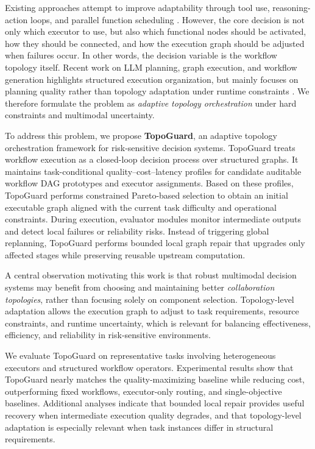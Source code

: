 \documentclass[manuscript,review,anonymous]{acmart}
\begin{document}
Existing approaches attempt to improve adaptability through tool use, reasoning-action loops, and parallel function scheduling \cite{schick2023toolformer,yao2023react,kim2024llm}. However, the core decision is not only which executor to use, but also which functional nodes should be activated, how they should be connected, and how the execution graph should be adjusted when failures occur. In other words, the decision variable is the workflow topology itself. Recent work on LLM planning, graph execution, and workflow generation highlights structured execution organization, but mainly focuses on planning quality rather than topology adaptation under runtime constraints \cite{huang2024understanding,zhai2025survey,li2024autoflow,zhang2024aflow,fan2024workflowllm,huang2023dag,peled2021graph}. We therefore formulate the problem as \emph{adaptive topology orchestration} under hard constraints and multimodal uncertainty.

To address this problem, we propose \textbf{TopoGuard}, an adaptive topology orchestration framework for risk-sensitive decision systems. TopoGuard treats workflow execution as a closed-loop decision process over structured graphs. It maintains task-conditional quality--cost--latency profiles for candidate auditable workflow DAG prototypes and executor assignments. Based on these profiles, TopoGuard performs constrained Pareto-based selection to obtain an initial executable graph aligned with the current task difficulty and operational constraints. During execution, evaluator modules monitor intermediate outputs and detect local failures or reliability risks. Instead of triggering global replanning, TopoGuard performs bounded local graph repair that upgrades only affected stages while preserving reusable upstream computation.

A central observation motivating this work is that robust multimodal decision systems may benefit from choosing and maintaining better \emph{collaboration topologies}, rather than focusing solely on component selection. Topology-level adaptation allows the execution graph to adjust to task requirements, resource constraints, and runtime uncertainty, which is relevant for balancing effectiveness, efficiency, and reliability in risk-sensitive environments.

We evaluate TopoGuard on representative tasks involving heterogeneous executors and structured workflow operators. Experimental results show that TopoGuard nearly matches the quality-maximizing baseline while reducing cost, outperforming fixed workflows, executor-only routing, and single-objective baselines. Additional analyses indicate that bounded local repair provides useful recovery when intermediate execution quality degrades, and that topology-level adaptation is especially relevant when task instances differ in structural requirements.
\end{document}
